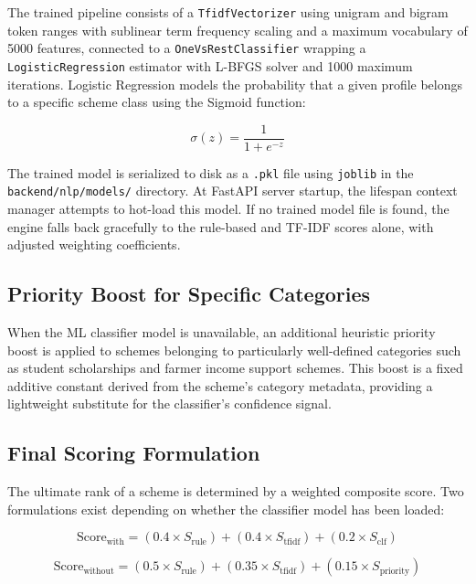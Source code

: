 \documentclass[10pt, journal, twocolumn]{IEEEtran}
\begin{document}
The trained pipeline consists of a \texttt{TfidfVectorizer} using unigram and bigram token ranges with sublinear term frequency scaling and a maximum vocabulary of 5000 features, connected to a \texttt{OneVsRestClassifier} wrapping a \texttt{LogisticRegression} estimator with L-BFGS solver and 1000 maximum iterations. Logistic Regression models the probability that a given profile belongs to a specific scheme class using the Sigmoid function:

\begin{equation}
    \sigma(z) = \frac{1}{1 + e^{-z}}
\end{equation}

The trained model is serialized to disk as a \texttt{.pkl} file using \texttt{joblib} in the \texttt{backend/nlp/models/} directory. At FastAPI server startup, the lifespan context manager attempts to hot-load this model. If no trained model file is found, the engine falls back gracefully to the rule-based and TF-IDF scores alone, with adjusted weighting coefficients.

\subsection{Priority Boost for Specific Categories}
When the ML classifier model is unavailable, an additional heuristic priority boost is applied to schemes belonging to particularly well-defined categories such as student scholarships and farmer income support schemes. This boost is a fixed additive constant derived from the scheme's category metadata, providing a lightweight substitute for the classifier's confidence signal.

\subsection{Final Scoring Formulation}
The ultimate rank of a scheme is determined by a weighted composite score. Two formulations exist depending on whether the classifier model has been loaded:

\begin{equation}
    \text{Score}_\text{with} = (0.4 \times S_\text{rule}) + (0.4 \times S_\text{tfidf}) + (0.2 \times S_\text{clf})
\end{equation}

\begin{equation}
    \text{Score}_\text{without} = (0.5 \times S_\text{rule}) + (0.35 \times S_\text{tfidf}) + (0.15 \times S_\text{priority})
\end{equation}
\end{document}
